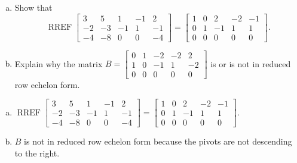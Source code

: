 
\begin{exerciseStatement}

\begin{enumerate}[(a)]
\item Show that \[\operatorname{RREF} \left[\begin{array}{ccccc}
3 & 5 & 1 & -1 & 2 \\
-2 & -3 & -1 & 1 & -1 \\
-4 & -8 & 0 & 0 & -4
\end{array}\right] = \left[\begin{array}{ccccc}
1 & 0 & 2 & -2 & -1 \\
0 & 1 & -1 & 1 & 1 \\
0 & 0 & 0 & 0 & 0
\end{array}\right] .\]
\item Explain why the matrix \(B= \left[\begin{array}{ccccc}
0 & 1 & -2 & -2 & 2 \\
1 & 0 & -1 & 1 & -2 \\
0 & 0 & 0 & 0 & 0
\end{array}\right] \) is or is not in reduced row echelon form.
\end{enumerate}
    
\end{exerciseStatement}
    
\begin{exerciseAnswer} 

\begin{enumerate}[(a)]
\item \(\operatorname{RREF} \left[\begin{array}{ccccc}
3 & 5 & 1 & -1 & 2 \\
-2 & -3 & -1 & 1 & -1 \\
-4 & -8 & 0 & 0 & -4
\end{array}\right] = \left[\begin{array}{ccccc}
1 & 0 & 2 & -2 & -1 \\
0 & 1 & -1 & 1 & 1 \\
0 & 0 & 0 & 0 & 0
\end{array}\right] .\)
\item \(B\) is not in reduced row echelon form because the pivots are not descending to the right. 
\end{enumerate}
    
\end{exerciseAnswer}
    
